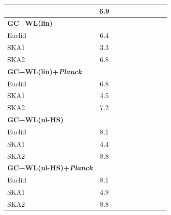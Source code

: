 \begin{table}[htbp]
\begin{tabular}{|l|c|c|c|c|c||c|c|c|c|}
& 6.9
\tabularnewline
\hline 
\hline 
\textbf{GC+WL(lin)} &  &  &  &  &  &  &  & & \Tstrut\tabularnewline
Euclid  

& 6.4
\tabularnewline
SKA1  

& 3.3
\tabularnewline
SKA2 

& 6.8
\tabularnewline
\hline 
\hline 
\textbf{GC+WL(lin)+{\it Planck}} &  &  &  &  &  &  &  & & \Tstrut\tabularnewline
Euclid  

& 6.8
\tabularnewline
SKA1  

& 4.5
\tabularnewline
SKA2 

& 7.2
\tabularnewline
\hline 
\hline 
\textbf{GC+WL(nl-HS)} &  &  &  &  &  &  &  & & \Tstrut\tabularnewline
Euclid  

& 8.1
\tabularnewline
SKA1  

& 4.4
\tabularnewline
SKA2 

& 8.8
\tabularnewline
\hline
\hline
\textbf{GC+WL(nl-HS)+{\it Planck}} &  &  &  &  &  &  &  & & \Tstrut\tabularnewline
Euclid  

& 8.1
\tabularnewline 
SKA1  

& 4.9
\tabularnewline 
SKA2 

& 8.8
\tabularnewline

\end{tabular}
\end{table}
